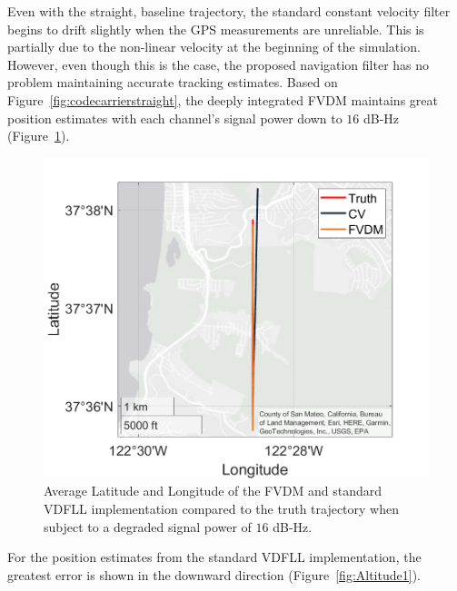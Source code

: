 Even with the straight, baseline trajectory, the standard constant velocity filter begins to drift slightly when the GPS measurements are unreliable. This is partially due to the non-linear velocity at the beginning of the simulation. However, even though this is the case, the proposed navigation filter has no problem maintaining accurate tracking estimates. Based on Figure~\ref{fig:codecarrierstraight}, the deeply integrated FVDM maintains great position estimates with each channel's signal power down to \(16\) dB-Hz (Figure~\ref{fig:GEOPLOT2}).

\begin{figure}[!ht]
    \centering
    \includegraphics[width=0.5\linewidth]{Figures/straight/16/GEOPLOT.png}
    \caption{Average Latitude and Longitude of the FVDM and standard VDFLL implementation compared to the truth trajectory when subject to a degraded signal power of \(16\) dB-Hz.}\label{fig:GEOPLOT2}
\end{figure}

For the position estimates from the standard VDFLL implementation, the greatest error is shown in the downward direction (Figure~\ref{fig:Altitude1}).

